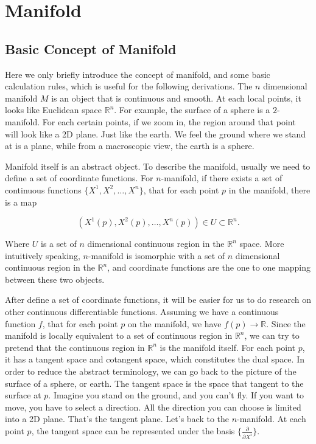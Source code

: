 \documentclass[../main.tex]{subfiles}
\begin{document}
\section{\textbf{Manifold}}

\subsection{Basic Concept of Manifold}

Here we only briefly introduce the concept of manifold, and some basic calculation rules, which is useful for the following derivations. The $n$ dimensional manifold $M$ is an object that is continuous and smooth. At each local points, it looks like Euclidean space $\mathbb{R}^n$. For example, the surface of a sphere is a $2$-manifold. For each certain points, if we zoom in, the region around that point will look like a 2D plane. Just like the earth. We feel the ground where we stand at is a plane, while from a macroscopic view, the earth is a sphere.

Manifold itself is an abstract object. To describe the manifold, usually we need to define a set of coordinate functions. For $n$-manifold, if there exists a set of continuous functions $\{X^1, X^2, \dots, X^n\}$, that for each point $p$ in the manifold, there is a map 

\begin{equation}
    \left(X^1(p), X^2(p), \dots, X^n(p)\right) \in U \subset \mathbb{R}^n.
\end{equation}

Where $U$ is a set of $n$ dimensional continuous region in the $\mathbb{R}^n$ space. More intuitively speaking, $n$-manifold is isomorphic with a set of $n$ dimensional continuous region in the $\mathbb{R}^n$, and coordinate functions are the one to one mapping between these two objects.

After define a set of coordinate functions, it will be easier for us to do research on other continuous differentiable functions. Assuming we have a continuous function $f$, that for each point $p$ on the manifold, we have $f(p) \to \mathbb{R}$. Since the manifold is locally equivalent to a set of continuous region in $\mathbb{R}^n$, we can try to pretend that the continuous region in $\mathbb{R}^n$ is the manifold itself. For each point $p$, it has a tangent space and cotangent space, which constitutes the dual space. In order to reduce the abstract terminology, we can go back to the picture of the surface of a sphere, or earth. The tangent space is the space that tangent to the surface at $p$. Imagine you stand on the ground, and you can't fly. If you want to move, you have to select a direction. All the direction you can choose is limited into a 2D plane. That's the tangent plane. Let's back to the $n$-manifold. At each point $p$, the tangent space can be represented under the basis $\{\frac{\partial}{\partial X^i}\}$.
\end{document}
